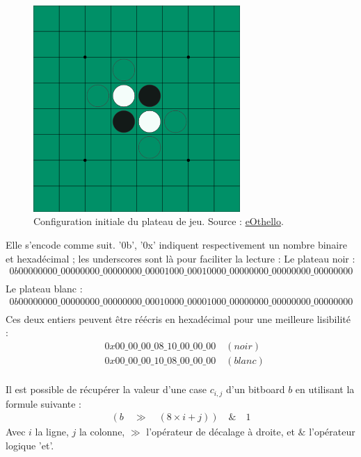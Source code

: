 \begin{figure}
    \centering
    \includegraphics[width=0.7\textwidth]{ressources/plateau_init.png}
    \caption{Configuration initiale du plateau de jeu. Source : \href{https://www.eothello.com/}{eOthello}.}
    \label{fig:init_board}
\end{figure}

Elle s'encode comme suit. '0b', '0x' indiquent respectivement un nombre binaire et hexadécimal ; les underscores sont là pour faciliter la lecture :
\newline \newline
\noindent Le plateau noir : 
\begin{align*}
0b00000000\_00000000\_00000000\_00001000\_00010000\_00000000\_00000000\_00000000 \\
\end{align*}
Le plateau blanc :
\begin{align*}
0b00000000\_00000000\_00000000\_00010000\_00001000\_00000000\_00000000\_00000000 \\
\end{align*}
Ces deux entiers peuvent être réécris en hexadécimal pour une meilleure lisibilité :
\begin{align*}
    &0x00\_00\_00\_08\_10\_00\_00\_00 \quad (noir)\\
    &0x00\_00\_00\_10\_08\_00\_00\_00 \quad (blanc)\\
\end{align*}

Il est possible de récupérer la valeur d'une case $c_{i,j}$ d'un bitboard $b$ en utilisant la formule suivante : 
\begin{align*}
    (b\quad \gg\quad (8\times i+j))\quad \&\quad 1
\end{align*}
Avec $i$ la ligne, $j$ la colonne, $\gg$ l'opérateur de décalage à droite, et $\&$ l'opérateur logique 'et'.

